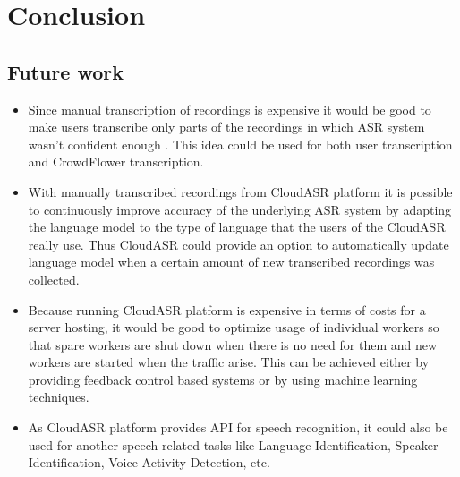 \chapter*{Conclusion}


\section*{Future work}
\begin{itemize}
  \item
    Since manual transcription of recordings is expensive
      it would be good to make users transcribe only parts of the recordings
      in which ASR system wasn't confident enough .
    This idea could be used for both user transcription and CrowdFlower transcription.

  \item
    With manually transcribed recordings from CloudASR platform
      it is possible to continuously improve accuracy of the underlying ASR system
      by adapting the language model to the type of language that the users of the CloudASR really use.
    Thus CloudASR could provide an option to automatically update language model
      when a certain amount of new transcribed recordings was collected.

  \item
    Because running CloudASR platform is expensive in terms of costs for a server hosting,
      it would be good to optimize usage of individual workers
      so that spare workers are shut down when there is no need for them
      and new workers are started when the traffic arise.
    This can be achieved either by providing feedback control based systems 
      or by using machine learning techniques. 

  \item
    As CloudASR platform provides API for speech recognition,
      it could also be used for another speech related tasks like Language Identification, Speaker Identification, Voice Activity Detection, etc.

\end{itemize}


